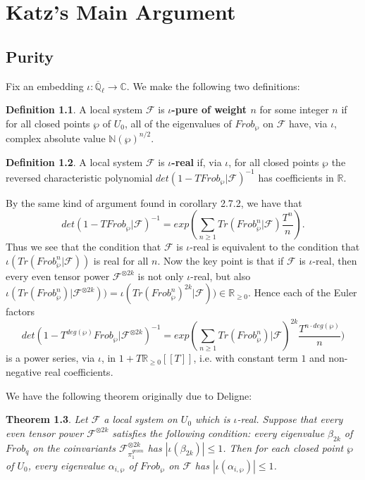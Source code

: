 \documentclass{ucbthesis}
\newtheorem{thm}{Theorem}[section]
\theoremstyle{definition}
\newtheorem{defn}[thm]{Definition}
\theoremstyle{theorem}
\begin{document}
\chapter{Katz's Main Argument}
\section{Purity}

Fix an embedding $\iota:\overline{\mathbb{Q}}_{\ell} \rightarrow \mathbb{C}$. We make the following two definitions:

\begin{defn} A local system $\mathcal{F}$ is \textbf{$\iota$-pure of weight $n$} for some integer $n$ if for all closed points $\wp$ of $U_{0}$, all of the eigenvalues of $Frob_{\wp}$ on $\mathcal{F}$ have, via $\iota$, complex absolute value $\mathbb{N}(\wp)^{n/2}$. 
\end{defn}

\begin{defn} A local system $\mathcal{F}$ is \textbf{$\iota$-real} if, via $\iota$, for all closed points $\wp$ the reversed characteristic polynomial $det(1-TFrob_{\wp}|\mathcal{F})^{-1}$ has coefficients in $\mathbb{R}$. 
\end{defn}

By the same kind of argument found in corollary 2.7.2, we have that 
$$det(1-TFrob_{\wp}|\mathcal{F})^{-1} = exp(\sum\limits_{n\geq 1}Tr(Frob_{\wp}^{n}|\mathcal{F})\frac{T^{n}}{n}).$$
Thus we see that the condition that $\mathcal{F}$ is $\iota$-real is equivalent to the condition that $\iota(Tr(Frob_{\wp}^{n}|\mathcal{F}))$ is real for all $n$. Now the key point is that if $\mathcal{F}$ is $\iota$-real, then every even tensor power $\mathcal{F}^{\otimes{2k}}$ is not only $\iota$-real, but also $\iota(Tr(Frob_{\wp}^{n})|\mathcal{F}^{\otimes{2k}})) = \iota(Tr(Frob_{\wp}^{n})^{2k}|\mathcal{F})) \in \mathbb{R}_{\geq 0}$. Hence each of the Euler factors 
$$det(1-T^{deg(\wp)}Frob_{\wp}|\mathcal{F}^{\otimes 2k})^{-1} = exp(\sum\limits_{n\geq 1}Tr(Frob_{\wp}^{n})|\mathcal{F})^{2k}\frac{T^{n\cdot deg(\wp)}}{n})$$
is a power series, via $\iota$, in $1 + T\mathbb{R}_{\geq 0}[[T]]$, i.e. with constant term $1$ and non-negative real coefficients.  

We have the following theorem originally due to Deligne:

\begin{thm}
Let $\mathcal{F}$ a local system on $U_{0}$ which is $\iota$-real. Suppose that every even tensor power
 $\mathcal{F}^{\otimes 2k}$ satisfies the following condition: every eigenvalue $\beta_{2k}$ of $Frob_{q}$ on
  the coinvariants $\mathcal{F}^{\otimes 2k}_{\pi_{1}^{geom}}$ has $|\iota(\beta_{2k})|\leq 1$. Then
   for each closed point $\wp$ of $U_{0}$, every eigenvalue $\alpha_{i,\wp}$ of $Frob_{\wp}$ on $\mathcal{F}$ has $|\iota(\alpha_{i,\wp})|\leq 1$. 
\end{thm}
\end{document}
